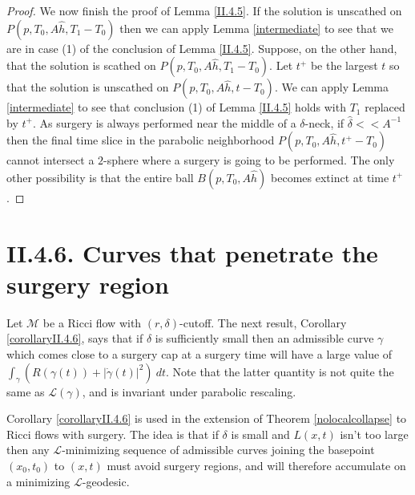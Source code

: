 \documentclass[12pt]{amsart}
\renewcommand{\L}{{\mathcal L}}
\newcommand{\M}{{\mathcal M}}
\newcommand{\de}{\delta}
\newcommand{\ga}{\gamma}
\numberwithin{equation}{section}
\theoremstyle{plain}
\theoremstyle{definition}
\theoremstyle{remark}
\begin{document}
\begin{proof}
We now finish the proof of Lemma \ref{II.4.5}. If the solution is
unscathed on $P(p,T_0,A\hat h,T_1-T_0)$ then we can apply
Lemma \ref{intermediate} to see
that we are in case (1) of the conclusion of Lemma \ref{II.4.5}. 
Suppose, on the other hand,
that the solution is scathed on $P(p,T_0,A\hat h,T_1-T_0)$. Let
$t^+$ be the largest $t$ so that the solution is unscathed on
$P(p,T_0,A\hat h,t-T_0)$.
We can apply
Lemma \ref{intermediate} to
see that conclusion (1) of Lemma \ref{II.4.5}
holds with $T_1$ replaced by $t^+$.
As surgery is always performed near the middle of a $\delta$-neck,
if $\hat \delta << A^{-1}$ then the final time slice in the parabolic
neighborhood $P(p,T_0,A\hat h,t^+-T_0)$ cannot intersect a
$2$-sphere where a surgery is going to be performed. 
The only other possibility is that
the entire ball $B(p,T_0,A\hat h)$ becomes extinct at time $t^+$.
\end{proof}

\section{II.4.6. Curves that penetrate the surgery region}
\label{II.4.6}

Let $\M$ be a Ricci flow with $(r,\de)$-cutoff.
The next result, Corollary \ref{corollaryII.4.6}, says that if $\de$ is sufficiently small
then an admissible curve $\ga$ which comes close
to a surgery cap at a surgery time will have a large value
of $\int_\gamma \left( R(\gamma(t))+|\dot{\ga}(t)|^2 \right) \: dt$.  
Note that the latter quantity is not quite the same as
${\mathcal L}(\gamma)$, and is invariant under parabolic rescaling.

Corollary \ref{corollaryII.4.6} is used in the extension of
Theorem \ref{nolocalcollapse} to Ricci flows with 
surgery.   The idea is that if $\de$ is small 
and $L(x,t)$ isn't too large then any $\L$-minimizing sequence of
admissible curves joining the basepoint $(x_0,t_0)$ to $(x,t)$
must avoid surgery regions, and will therefore 
accumulate on a minimizing $\L$-geodesic.
\end{document}
